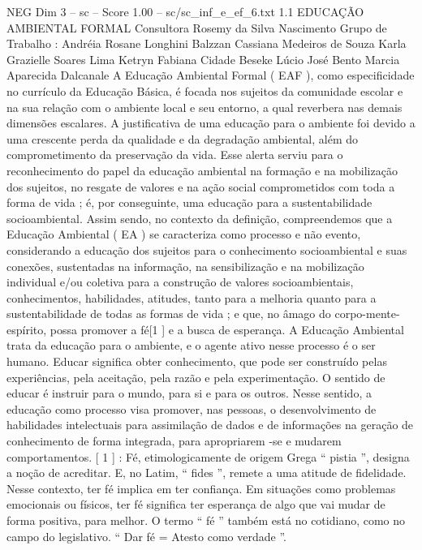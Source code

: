 \begin{textsample}{NEG Dim 3 – sc – Score 1.00 – sc/sc\_inf\_e\_ef\_6.txt}  \label{ex:f3_neg_223}
1.1 EDUCAÇÃO AMBIENTAL FORMAL Consultora Rosemy da Silva Nascimento Grupo de Trabalho : Andréia Rosane Longhini Balzzan Cassiana Medeiros de Souza Karla Grazielle Soares Lima Ketryn Fabiana Cidade Beseke Lúcio José Bento Marcia Aparecida Dalcanale A Educação Ambiental Formal ( EAF ), como especificidade no currículo da Educação Básica, é focada nos sujeitos da comunidade escolar e na sua relação com o ambiente local e seu entorno, a qual reverbera nas demais dimensões escalares.
A justificativa de uma educação para o ambiente foi devido a uma crescente perda da qualidade e da degradação ambiental, além do comprometimento da preservação da vida.
Esse alerta serviu para o reconhecimento do papel da educação ambiental na formação e na mobilização dos sujeitos, no resgate de valores e na ação social comprometidos com toda a forma de vida ; é, por conseguinte, uma educação para a sustentabilidade socioambiental.
Assim sendo, no contexto da definição, compreendemos que a Educação Ambiental ( EA ) se caracteriza como processo e não evento, considerando a educação dos sujeitos para o conhecimento socioambiental e suas conexões, sustentadas na informação, na sensibilização e na mobilização individual e/ou coletiva para a construção de valores socioambientais, conhecimentos, habilidades, atitudes, tanto para a melhoria quanto para a sustentabilidade de todas as formas de vida ; e que, no âmago do corpo-mente-espírito, possa promover a fé[1 ] e a busca de esperança.
A Educação Ambiental trata da educação para o ambiente, e o agente ativo nesse processo é o ser humano.
Educar significa obter conhecimento, que pode ser construído pelas experiências, pela aceitação, pela razão e pela experimentação.
O sentido de educar é instruir para o mundo, para si e para os outros.
Nesse sentido, a educação como processo visa promover, nas pessoas, o desenvolvimento de habilidades intelectuais para assimilação de dados e de informações na geração de conhecimento de forma integrada, para apropriarem -se e mudarem comportamentos. [ 1 ] : Fé, etimologicamente de origem Grega “ pistia ”, designa a noção de acreditar.
E, no Latim, “ fides ”, remete a uma atitude de fidelidade.
Nesse contexto, ter fé implica em ter confiança.
Em situações como problemas emocionais ou físicos, ter fé significa ter esperança de algo que vai mudar de forma positiva, para melhor.
O termo “ fé ” também está no cotidiano, como no campo do legislativo. “ Dar fé = Atesto como verdade ”.

\end{textsample}
